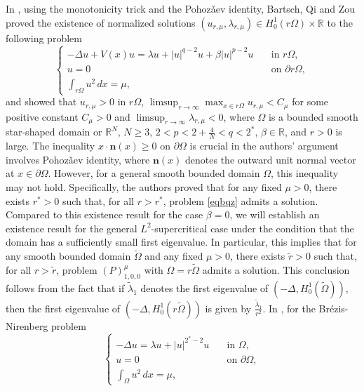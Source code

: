 \documentclass[11pt]{amsart}
\newcommand{\abs}[1]{\lvert#1\rvert}
\newcommand{\R}{\mathbb{R}}
\numberwithin{equation}{section}
\begin{document}
In \cite{BQZ}, using the monotonicity trick and the Pohoz\v{a}ev identity, Bartsch, Qi and Zou proved the existence of
normalized solutions $(u_{r,\mu},\lambda_{r,\mu})\in H_0^1(r\Omega)\times\R$ to the following problem
\begin{equation}\label{eqbqz}
    \left\{
\begin{array}{ll}
	-\Delta u +V(x)u = \lambda u + \abs{u}^{q-2}u + \beta\abs{u}^{p-2}u\quad & \text{in } r\Omega, \\
	u = 0 & \text{on } \partial r\Omega, \\
	\int_{r\Omega} u^2\,dx = \mu,
\end{array}
\right.
\end{equation}
and showed that $u_{r,\mu} > 0$ in $r\Omega$, $\displaystyle \limsup_{r \to \infty}\max_{x \in r \Omega}u_{r,\mu}<C_\mu$ for some positive constant $C_\mu > 0$ and $\displaystyle \limsup_{r \to \infty}\lambda_{r,\mu}<0$, where $\Omega$ is a bounded smooth star-shaped domain or $\R^N$, $N \geq 3$,  $2<p<2 +\frac{4}{N} <q <2^*$, $\beta \in \R$, and $r>0$ is large. The inequality $x\cdot \bm{n}(x)\geq 0$ on $\partial\Omega$ is crucial in the authors' argument involves Pohoz\v{a}ev identity, where $\bm{n}(x)$ denotes the outward unit normal vector at $x \in \partial\Omega$. However, for a general  smooth bounded domain $\Omega$, this inequality may not hold. Specifically, the authors proved that for any fixed $\mu >0$, there exists $r^*>0$ such that, for all $r>r^*$, problem \eqref{eqbqz} admits a solution. Compared to this existence result for the case $\beta =0$, we will establish an existence result for the general $L^2$-supercritical case  under the condition that the domain has a sufficiently small first eigenvalue. In particular, this implies that for any smooth bounded domain $\tilde{\Omega}$ and any fixed $\mu >0$, there exists $\tilde{r}>0$ such that, for all $r>\tilde{r}$, problem $(P)^{\mu}_{1,0,0}$ with $\Omega =r\tilde{\Omega}$ admits a solution. This conclusion follows from the fact that if $\tilde{\lambda}_1$ denotes the first eigenvalue of $(-\Delta,H_0^1(\tilde{\Omega}))$, then the first eigenvalue of $(-\Delta,H_0^1(r\tilde{\Omega}))$ is given by  $\frac{\tilde{\lambda}_1}{r^2}$. In \cite{Song}, for the Br\'ezis-Nirenberg problem
$$
\left\{
\begin{array}{ll}
	-\Delta u = \lambda u + \abs{u}^{2^*-2}u\quad & \text{in } \Omega, \\
	u = 0 & \text{on } \partial \Omega, \\
	\int_{\Omega}u^2\,dx = \mu,
\end{array}
\right.
$$
\end{document}
